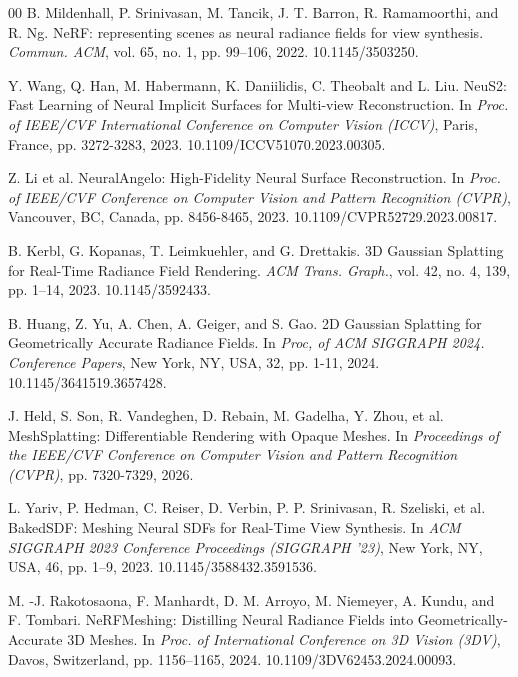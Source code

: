\documentclass{ieeeaccess}
\begin{document}
\begin{thebibliography}{00}
B. Mildenhall, P. Srinivasan, M. Tancik, J. T. Barron, R. Ramamoorthi, and R. Ng. NeRF: representing scenes as neural radiance fields for view synthesis. \textit{Commun. ACM}, vol. 65, no. 1, pp. 99--106, 2022. 10.1145/3503250.

Y. Wang, Q. Han, M. Habermann, K. Daniilidis, C. Theobalt and L. Liu. NeuS2: Fast Learning of Neural Implicit Surfaces for Multi-view Reconstruction. In \textit{Proc. of IEEE/CVF International Conference on Computer Vision (ICCV)}, Paris, France, pp. 3272-3283, 2023. 10.1109/ICCV51070.2023.00305.


Z. Li et al. NeuralAngelo: High-Fidelity Neural Surface Reconstruction. In \textit{Proc. of IEEE/CVF Conference on Computer Vision and Pattern Recognition (CVPR)}, Vancouver, BC, Canada, pp. 8456-8465, 2023. 10.1109/CVPR52729.2023.00817.

B. Kerbl, G. Kopanas, T. Leimkuehler, and G. Drettakis. 3D Gaussian Splatting for Real-Time Radiance Field Rendering. \textit{ACM Trans. Graph.}, vol. 42, no. 4, 139, pp. 1--14, 2023. 10.1145/3592433.

B. Huang, Z. Yu, A. Chen, A. Geiger, and S. Gao. 2D Gaussian Splatting for Geometrically Accurate Radiance Fields. In \textit{Proc, of ACM SIGGRAPH 2024. Conference Papers}, New York, NY, USA, 32, pp. 1-11, 2024. 10.1145/3641519.3657428.

J. Held, S. Son, R. Vandeghen, D. Rebain, M. Gadelha, Y. Zhou, et al. MeshSplatting: Differentiable Rendering with Opaque Meshes. In \textit{Proceedings of the IEEE/CVF Conference on Computer Vision and Pattern Recognition (CVPR)}, pp. 7320-7329, 2026.

L. Yariv, P. Hedman, C. Reiser, D. Verbin, P. P. Srinivasan, R. Szeliski, et al. BakedSDF: Meshing Neural SDFs for Real-Time View Synthesis. In \textit{ACM SIGGRAPH 2023 Conference Proceedings (SIGGRAPH '23)}, New York, NY, USA, 46, pp. 1--9, 2023. 10.1145/3588432.3591536.


M. -J. Rakotosaona, F. Manhardt, D. M. Arroyo, M. Niemeyer, A. Kundu, and F. Tombari. NeRFMeshing: Distilling Neural Radiance Fields into Geometrically-Accurate 3D Meshes. In \textit{Proc. of International Conference on 3D Vision (3DV)}, Davos, Switzerland, pp. 1156--1165, 2024. 10.1109/3DV62453.2024.00093.


\end{thebibliography}
\end{document}
